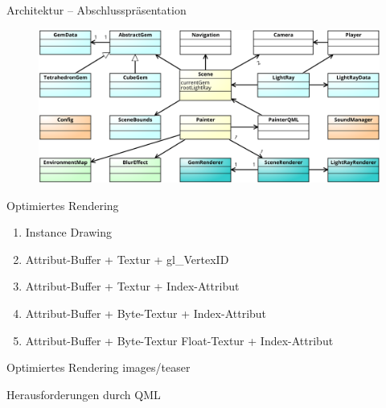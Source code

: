 \begin{frame}{Architektur -- Abschlusspräsentation}
	\begin{figure}
		\centering
		\includegraphics[width=\textwidth, height=0.8\textheight, keepaspectratio]{images/klassendiagramm-final}
	\end{figure}
\end{frame}

\begin{frame}{Optimiertes Rendering}
	\begin{enumerate}
		\item Instance Drawing
		\vfill
		\item Attribut-Buffer + Textur + gl\_VertexID
		\vfill
		\item Attribut-Buffer + Textur + Index-Attribut
		\vfill
		\item Attribut-Buffer + Byte-Textur + Index-Attribut
		\vfill
		\item Attribut-Buffer + Byte-Textur \/ Float-Textur + Index-Attribut
	\end{enumerate}
\end{frame}

\slidegraphic
{Optimiertes Rendering}
{images/teaser}
{}

\begin{frame}{Herausforderungen durch QML}
	\centering
\end{frame}


